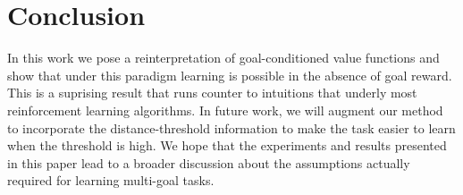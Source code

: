 \section{Conclusion}
In this work we pose a reinterpretation of goal-conditioned value
functions and show that under this paradigm learning is possible in the
absence of goal reward. This is a suprising result that runs counter
to intuitions that underly most reinforcement learning algorithms.  
In future work, we will augment our method to incorporate the
distance-threshold information to make the task easier to learn when the
threshold is high. 
We hope that the experiments and results presented in this paper  lead
to a broader discussion about the assumptions actually required for
learning multi-goal tasks.
